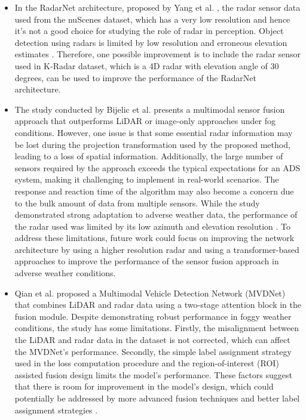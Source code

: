 \documentclass[rnd]{mas_proposal}
\begin{document}
\begin{itemize}
      \item In the RadarNet architecture, proposed by Yang et al. \cite{yang2020radarnet}, the radar sensor data used from the nuScenes dataset, which has a very low resolution and hence it's not a good choice for studying the role of radar in perception. Object detection using radars is limited by low resolution and erroneous elevation estimates \cite{ulrich2021deepreflecs} \cite{drews2022deepfusion}. Therefore, one possible improvement is to include the radar sensor used in K-Radar dataset, which is a 4D radar with elevation angle of 30 degrees, can be used to improve the performance of the RadarNet architecture.
      \item The study conducted by Bijelic et al. \cite{bijelic2020seeing} presents a multimodal sensor fusion approach that outperforms LiDAR or image-only approaches under fog conditions. However, one issue is that some essential radar information may be lost during the projection transformation used by the proposed method, leading to a loss of spatial information. Additionally, the large number of sensors required by the approach exceeds the typical expectations for an ADS system, making it challenging to implement in real-world scenarios. The response and reaction time of the algorithm may also become a concern due to the bulk amount of data from multiple sensors. While the study demonstrated strong adaptation to adverse weather data, the performance of the radar used was limited by its low azimuth and elevation resolution \cite{Zhang2021Dec}. To address these limitations, future work could focus on improving the network architecture by using a higher resolution radar and using a transformer-based approaches to improve the performance of the sensor fusion approach in adverse weather conditions.

      \item Qian et al. \cite{qian2021robust} proposed a Multimodal Vehicle Detection Network (MVDNet) that combines LiDAR and radar data using a two-stage attention block in the fusion module. Despite demonstrating robust performance in foggy weather conditions, the study has some limitations. Firstly, the misalignment between the LiDAR and radar data in the dataset is not corrected, which can affect the MVDNet's performance. Secondly, the simple label assignment strategy used in the loss computation procedure and the region-of-interest (ROI) assisted fusion design limits the model's performance. These factors suggest that there is room for improvement in the model's design, which could potentially be addressed by more advanced fusion techniques and better label assignment strategies \cite{yang2022ralibev}.
      

\end{itemize}
\end{document}
